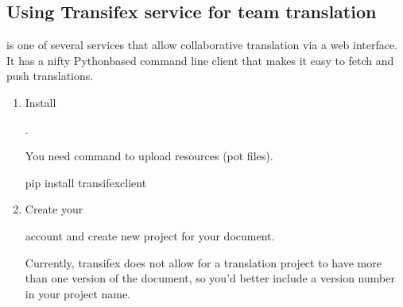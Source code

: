 \documentclass[letterpaper,10pt,english]{sphinxmanual}
\begin{document}
\subsection{Using Transifex service for team translation}
\label{\detokenize{usage/advanced/intl:using-transifex-service-for-team-translation}}
%
\begin{footnote}[6]\sphinxAtStartFootnote
{}
%
\end{footnote} is one of several services that allow collaborative translation via a
web interface.  It has a nifty Python\sphinxhyphen{}based command line client that makes it
easy to fetch and push translations.
\begin{enumerate}
%
\item {} 
Install %
\begin{footnote}[7]\sphinxAtStartFootnote
{}
%
\end{footnote}.

You need  command to upload resources (pot files).

\begin{sphinxVerbatim}[commandchars=\\\{\}]
 pip install transifex\PYGZhy{}client
\end{sphinxVerbatim}




%
\begin{footnote}[8]\sphinxAtStartFootnote
{}
%
\end{footnote}



\item {} 
Create your %
\begin{footnote}[9]\sphinxAtStartFootnote
{}
%
\end{footnote} account and create new project for your document.

Currently, transifex does not allow for a translation project to have more
than one version of the document, so you’d better include a version number in
your project name.


\end{enumerate}
\end{document}
